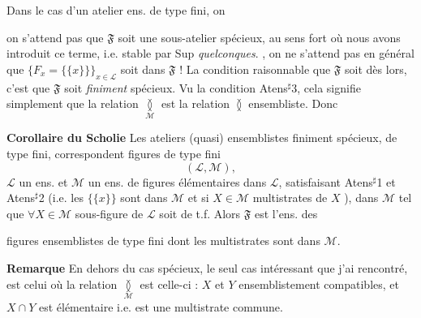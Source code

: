 \documentclass[11pt,a4paper]{article}
\begin{document}
Dans le cas d'un atelier ens.  de type fini, on  

on s'attend pas  que $\mathfrak{F}$ soit une sous-atelier spécieux, au sens  fort où nous avons introduit ce terme, i.e. stable par Sup \emph{quelconques}. , on ne s'attend pas en général que \struck{\ill{}} $\lbrace F_x = \lbrace \lbrace x \rbrace \rbrace \rbrace_{x \in \mathcal{L}}$ soit dans $\mathfrak{F}$ ! La condition raisonnable \ill{} \ill{} que $\mathfrak{F}$ soit \ill{} \ill{} dès lors, c'est que $\mathfrak{F}$ soit \emph{finiment} spécieux. Vu la condition Atens$^{\sharp}$3, cela signifie simplement que la relation $\underset{\mathcal{M}}{\between}$ est la relation  $\between$ ensembliste. Donc


\textbf{Corollaire du Scholie} Les ateliers (quasi) ensemblistes finiment spécieux, \add{\ill{}} de type fini, correspondent \ill{} figures de type fini
\[
  (\mathcal{L}, \mathcal{M}),
\]
$\mathcal{L}$ un ens. et $\mathcal{M}$ un ens. de figures élémentaires dans $\mathcal{L}$, satisfaisant Atens$^{\sharp}$1 et Atens$^{\sharp}$2 (i.e. les $\lbrace \lbrace x \rbrace \rbrace$ sont dans $\mathcal{M}$ et si $X \in \mathcal{M}$ \ill{} multistrates de $X$ \ill{}),  dans $\mathcal{M}$  tel que $\forall X \in \mathcal{M}$  sous-figure de $\mathcal{L}$ soit de t.f. Alors $\mathfrak{F}$ est l'ens. des

figures ensemblistes de type fini dont les multistrates sont dans $\mathcal{M}$.

\textbf{Remarque} En dehors du cas  spécieux, le seul  cas intéressant que j'ai rencontré, est celui où la \struck{\ill{}} relation $\underset{\mathcal{M}}{\between}$ est celle-ci : $X$ et $Y$ ensemblistement compatibles, et $X \cap Y$ est \struck{\ill{}}  élémentaire i.e. est une multistrate commune.
\end{document}
